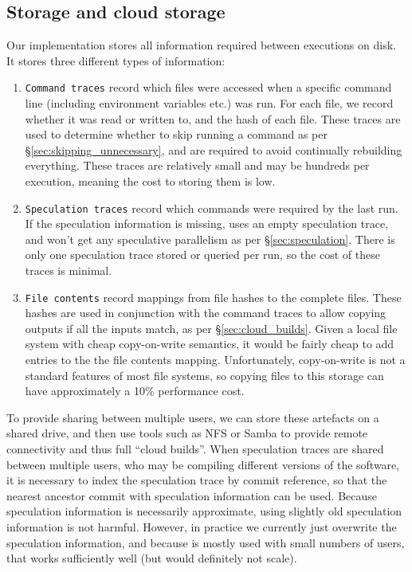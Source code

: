 \subsection{Storage and cloud storage}
\label{sec:cloud_implementation}

Our \Rattle implementation stores all information required between executions on disk. It stores three different types of information:

\begin{enumerate}
\item \texttt{Command traces} record which files were accessed when a specific command line (including environment variables etc.) was run. For each file, we record whether it was read or written to, and the hash of each file. These traces are used to determine whether to skip running a command as per \S\ref{sec:skipping_unnecessary}, and are required to avoid continually rebuilding everything. These traces are relatively small and may be hundreds per execution, meaning the cost to storing them is low.
\item \texttt{Speculation traces} record which commands were required by the last run. If the speculation information is missing, \Rattle uses an empty speculation trace, and won't get any speculative parallelism as per \S\ref{sec:speculation}. There is only one speculation trace stored or queried per run, so the cost of these traces is minimal.
\item \texttt{File contents} record mappings from file hashes to the complete files. These hashes are used in conjunction with the command traces to allow copying outputs if all the inputs match, as per \S\ref{sec:cloud_builds}. Given a local file system with cheap copy-on-write semantics, it would be fairly cheap to add entries to the the file contents mapping. Unfortunately, copy-on-write is not a standard features of most file systems, so copying files to this storage can have approximately a 10\% performance cost.
\end{enumerate}

To provide sharing between multiple users, we can store these artefacts on a shared drive, and then use tools such as NFS or Samba to provide remote connectivity and thus full ``cloud builds''. When speculation traces are shared between multiple users, who may be compiling different versions of the software, it is necessary to index the speculation trace by commit reference, so that the nearest ancestor commit with speculation information can be used. Because speculation information is necessarily approximate, using slightly old speculation information is not harmful. However, in practice we currently just overwrite the speculation information, and because \Rattle is mostly used with small numbers of users, that works sufficiently well (but would definitely not scale).

